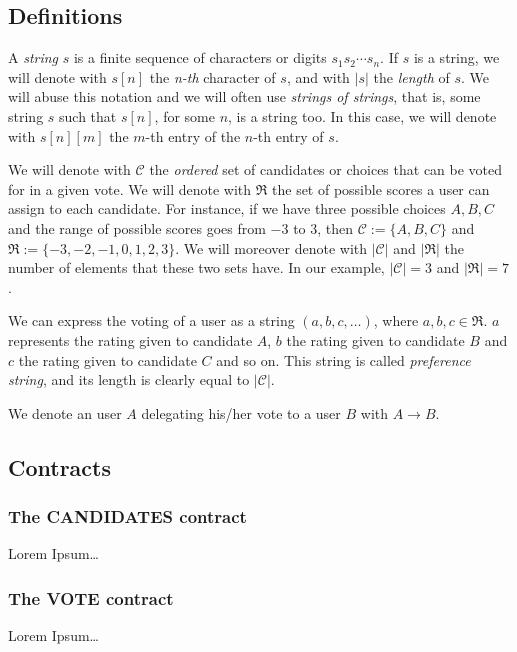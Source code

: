 \documentclass[submission, copyright,creativecommons,sharealike,noncommercial]{eptcs}
\newcommand{\candidates}{\ensuremath{\mathcal{C}} \xspace}
\newcommand{\range}{\ensuremath{\mathfrak{R}}\xspace}
\newcommand{\Candidates}{\textbf{CANDIDATES}\xspace}
\newcommand{\Vote}{\textbf{VOTE}\xspace}
\begin{document}
\subsection{Definitions}
%
	\begin{definition}
		A \emph{string} $s$ is a finite sequence of characters or digits $s_1 s_2 \cdots s_n$. If $s$ is a string, we will denote with $s[n]$ the \emph{n-th} character of $s$, and with $|s|$ the \emph{length} of $s$. We will abuse this notation and we will often use \emph{strings of strings}, that is, some string $s$ such that $s[n]$, for some $n$, is a string too. In this case, we will denote with $s[n][m]$ the $m$-th entry of the $n$-th entry of $s$.
	\end{definition}	
%	
	\begin{definition}
		We will denote with \candidates the \emph{ordered} set of candidates or choices that can be voted for in a given vote. We will denote with \range the set of possible scores a user can assign to each candidate. For instance, if we have three possible choices $A,B,C$ and the range of possible scores goes from $-3$ to $3$, then $\candidates := \{A, B, C\}$ and $\range := \{-3,-2,-1,0,1,2,3\}$. We will moreover denote with $| \candidates|$ and $|\range|$ the number of elements that these two sets have. In our example, $|\candidates | = 3$ and $|\range|=7$.
	\end{definition}
%	
	\begin{definition}\label{voting string}		
		We can express the voting of a user as a string $(a,b,c, \dots)$, where $a,b,c \in \range$. $a$ represents the rating given to candidate $A$, $b$ the rating given to candidate $B$ and $c$ the rating given to candidate $C$ and so on. This string is called \emph{preference string}, and its length is clearly equal to $|\candidates|$.
	\end{definition}
%
	\begin{definition}
 		We denote an user $A$ delegating his/her vote to a user $B$ with $A \to B$.
	\end{definition}
%
%
\subsection{Contracts}
%
\subsubsection{The \Candidates contract}
Lorem Ipsum\dots
%
%
\subsubsection{The \Vote contract}
Lorem Ipsum\dots
%
%
\end{document}
